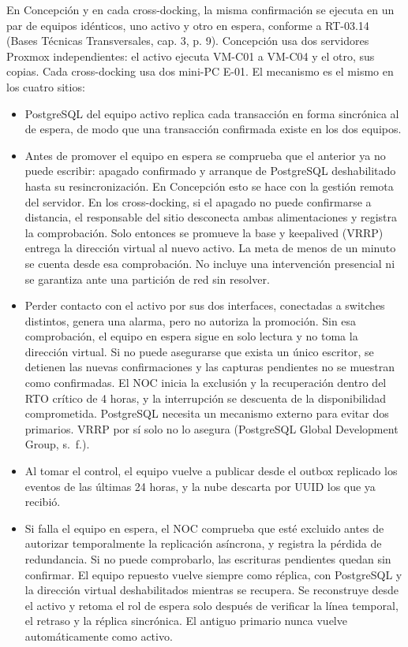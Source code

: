 En Concepción y en cada cross-docking, la misma confirmación se ejecuta en un par de equipos idénticos, uno activo y otro en espera, conforme a RT-03.14 (Bases Técnicas Transversales, cap. 3, p. 9). Concepción usa dos servidores Proxmox independientes: el activo ejecuta VM-C01 a VM-C04 y el otro, sus copias. Cada cross-docking usa dos mini-PC E-01. El mecanismo es el mismo en los cuatro sitios:

\begin{itemize}
  \item PostgreSQL del equipo activo replica cada transacción en forma sincrónica al de espera, de modo que una transacción confirmada existe en los dos equipos.
  \item Antes de promover el equipo en espera se comprueba que el anterior ya no puede escribir: apagado confirmado y arranque de PostgreSQL deshabilitado hasta su resincronización. En Concepción esto se hace con la gestión remota del servidor. En los cross-docking, si el apagado no puede confirmarse a distancia, el responsable del sitio desconecta ambas alimentaciones y registra la comprobación. Solo entonces se promueve la base y keepalived (VRRP) entrega la dirección virtual al nuevo activo. La meta de menos de un minuto se cuenta desde esa comprobación. No incluye una intervención presencial ni se garantiza ante una partición de red sin resolver.
  \item Perder contacto con el activo por sus dos interfaces, conectadas a switches distintos, genera una alarma, pero no autoriza la promoción. Sin esa comprobación, el equipo en espera sigue en solo lectura y no toma la dirección virtual. Si no puede asegurarse que exista un único escritor, se detienen las nuevas confirmaciones y las capturas pendientes no se muestran como confirmadas. El NOC inicia la exclusión y la recuperación dentro del RTO crítico de 4 horas, y la interrupción se descuenta de la disponibilidad comprometida. PostgreSQL necesita un mecanismo externo para evitar dos primarios. VRRP por sí solo no lo asegura (PostgreSQL Global Development Group, s.~f.).
  \item Al tomar el control, el equipo vuelve a publicar desde el outbox replicado los eventos de las últimas 24 horas, y la nube descarta por UUID los que ya recibió.
  \item Si falla el equipo en espera, el NOC comprueba que esté excluido antes de autorizar temporalmente la replicación asíncrona, y registra la pérdida de redundancia. Si no puede comprobarlo, las escrituras pendientes quedan sin confirmar. El equipo repuesto vuelve siempre como réplica, con PostgreSQL y la dirección virtual deshabilitados mientras se recupera. Se reconstruye desde el activo y retoma el rol de espera solo después de verificar la línea temporal, el retraso y la réplica sincrónica. El antiguo primario nunca vuelve automáticamente como activo.
\end{itemize}

